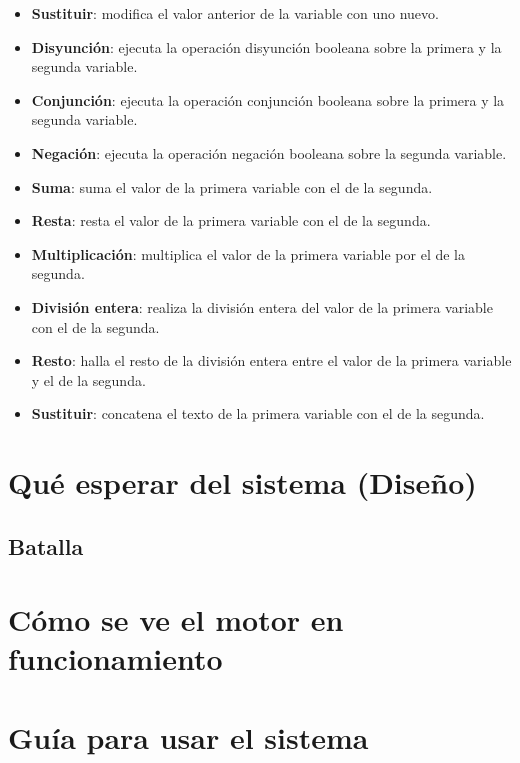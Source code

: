 \begin{itemize}
	\item \textbf{Sustituir}: modifica el valor anterior de la variable con uno nuevo.
	\item \textbf{Disyunción}: ejecuta la operación disyunción booleana sobre la primera y la segunda variable.
	\item \textbf{Conjunción}: ejecuta la operación conjunción booleana sobre la primera y la segunda variable.
	\item \textbf{Negación}: ejecuta la operación negación booleana sobre la segunda variable.
	\item \textbf{Suma}: suma el valor de la primera variable con el de la segunda.
	\item \textbf{Resta}: resta el valor de la primera variable con el de la segunda.
	\item \textbf{Multiplicación}: multiplica el valor de la primera variable por el de la segunda.
	\item \textbf{División entera}: realiza la división entera del valor de la primera variable con el de la segunda.
	\item \textbf{Resto}: halla el resto de la división entera entre el valor de la primera variable y el de la segunda.
	\item \textbf{Sustituir}: concatena el texto de la primera variable con el de la segunda.
\end{itemize}

 

\section{Qué esperar del sistema (Diseño)} \label{designSection}

\subsection{Batalla} \label{battleDesignSubsection}

\section{Cómo se ve el motor en funcionamiento}

\section{Guía para usar el sistema} \label{engineGuideSection}

